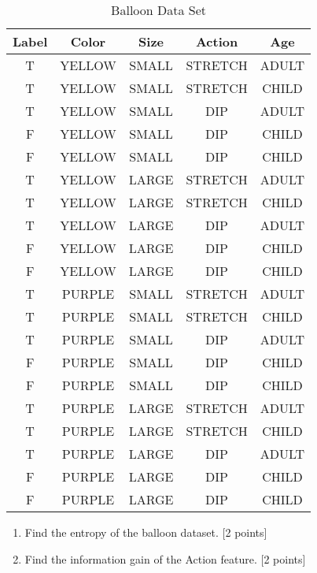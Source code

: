 \begin{enumerate}
  \begin{table}[h]
    \centering
    \begin{tabular}{|c|cccc|}
      \hline
      Label & Color  & Size  & Action  & Age   \\
      \hline
      T     & YELLOW & SMALL & STRETCH & ADULT \\
      T     & YELLOW & SMALL & STRETCH & CHILD \\
      T     & YELLOW & SMALL & DIP     & ADULT \\
      F     & YELLOW & SMALL & DIP     & CHILD \\
      F     & YELLOW & SMALL & DIP     & CHILD \\
      T     & YELLOW & LARGE & STRETCH & ADULT \\
      T     & YELLOW & LARGE & STRETCH & CHILD \\
      T     & YELLOW & LARGE & DIP     & ADULT \\
      F     & YELLOW & LARGE & DIP     & CHILD \\
      F     & YELLOW & LARGE & DIP     & CHILD \\
      T     & PURPLE & SMALL & STRETCH & ADULT \\
      T     & PURPLE & SMALL & STRETCH & CHILD \\
      T     & PURPLE & SMALL & DIP     & ADULT \\
      F     & PURPLE & SMALL & DIP     & CHILD \\
      F     & PURPLE & SMALL & DIP     & CHILD \\
      T     & PURPLE & LARGE & STRETCH & ADULT \\
      T     & PURPLE & LARGE & STRETCH & CHILD \\
      T     & PURPLE & LARGE & DIP     & ADULT \\
      F     & PURPLE & LARGE & DIP     & CHILD \\
      F     & PURPLE & LARGE & DIP     & CHILD \\
      \hline
    \end{tabular}
    \caption{Balloon Data Set}
    \label{balloon}
  \end{table}



  \begin{enumerate}
  \item Find the entropy of the balloon dataset. [2 points]

  \item Find the information gain of the Action feature. [2 points]


\end{enumerate}
\end{enumerate}
